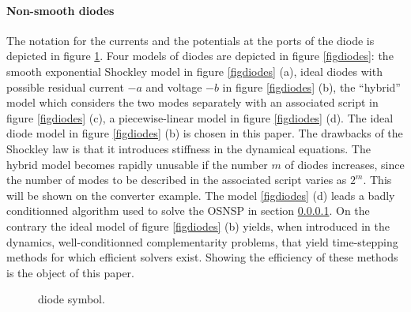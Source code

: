 \paragraph{Non-smooth  diodes}  The notation for the currents and the potentials at the ports of
the diode is depicted in figure \ref{fig:DIODE}. Four models of diodes are depicted in figure \ref{figdiodes}: the smooth exponential Shockley model in figure \ref{figdiodes} (a), ideal diodes with possible residual current $-a$ and voltage $-b$ in figure \ref{figdiodes} (b), the ``hybrid'' model which considers the two modes separately with an associated script in figure \ref{figdiodes} (c), a piecewise-linear model in figure \ref{figdiodes} (d). The ideal diode model in figure  \ref{figdiodes} (b) is chosen in this paper. The drawbacks of the Shockley law is that it introduces stiffness in the dynamical equations. The hybrid model becomes rapidly unusable if the number $m$ of diodes increases, since the number of modes to be described in the associated script varies as $2^{m}$. This will be shown on the converter example. The model \ref{figdiodes} (d) leads a badly conditionned  algorithm  used to solve the OSNSP in section \ref{}. On the contrary the ideal model of figure  \ref{figdiodes} (b) yields, when introduced in the dynamics, well-conditionned complementarity problems, that yield time-stepping methods for which efficient solvers exist. Showing the efficiency of these methods is the object of this paper.


\begin{figure}
  \centering
  
  \caption{diode symbol.}
  \label{fig:DIODE}
\end{figure}


